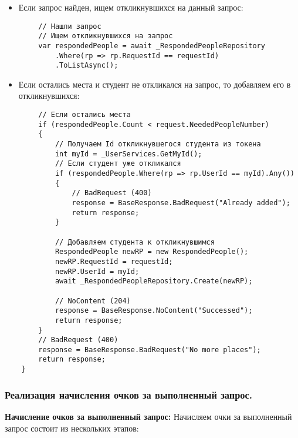 \begin{itemize}
	\item{Если запрос найден, ищем откликнувшихся на данный запрос:}
\end{itemize}
\begin{verbatim}
        // Нашли запрос
        // Ищем откликнувшихся на запрос
        var respondedPeople = await _RespondedPeopleRepository
            .Where(rp => rp.RequestId == requestId)
            .ToListAsync();
\end{verbatim}

\begin{itemize}
	\item{Если остались места и студент не откликался на запрос, то добавляем его в откликнувшихся:}
\end{itemize}
\begin{verbatim}
        // Если остались места
        if (respondedPeople.Count < request.NeededPeopleNumber)
        {
            // Получаем Id откликнувшегося студента из токена
            int myId = _UserServices.GetMyId();
            // Если студент уже откликался
            if (respondedPeople.Where(rp => rp.UserId == myId).Any())
            {
                // BadRequest (400)
                response = BaseResponse.BadRequest("Already added");
                return response;
            }

            // Добавляем студента к откликнувшимся
            RespondedPeople newRP = new RespondedPeople();
            newRP.RequestId = requestId;
            newRP.UserId = myId;
            await _RespondedPeopleRepository.Create(newRP);

            // NoContent (204)
            response = BaseResponse.NoContent("Successed");
            return response;
        }
        // BadRequest (400)
        response = BaseResponse.BadRequest("No more places");
        return response;
    }
\end{verbatim}

\subsubsection{Реализация начисления очков за выполненный запрос.}

\textbf{Начисление очков за выполненный запрос:} Начисляем очки за выполненный запрос состоит из нескольких этапов:


